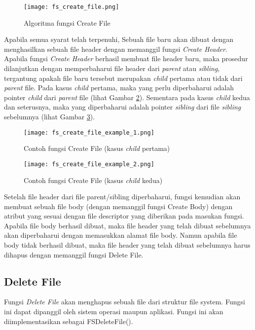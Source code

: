 \documentclass[a4paper, 12pt]{report}
\begin{document}
\begin{figure}
\centering
\texttt{[image: fs\_create\_file.png]}
\caption{Algoritma fungsi Create File}
\label{fig-create-file}
\end{figure}

Apabila semua syarat telah terpenuhi, Sebuah file baru akan dibuat dengan menghasilkan sebuah file header dengan memanggil fungsi {\em Create Header}. Apabila fungsi {\em Create Header} berhasil membuat file header baru, maka prosedur dilanjutkan dengan memperbaharui file header dari {\em parent} atau {\em sibling}, tergantung apakah file baru tersebut merupakan {\em child} pertama atau tidak dari {\em parent} file. Pada kasus {\em child} pertama, maka yang perlu diperbaharui adalah pointer {\em child} dari {\em parent} file (lihat Gambar \ref{fig-create-file-example-1}). Sementara pada kasus {\em child} kedua dan seterusnya, maka yang diperbaharui adalah pointer {\em sibling} dari file {\em sibling} sebelumnya (lihat Gambar \ref{fig-create-file-example-2}).

\begin{figure}
\centering
\texttt{[image: fs\_create\_file\_example\_1.png]}
\caption{Contoh fungsi Create File (kasus {\em child} pertama)}
\label{fig-create-file-example-1}
\end{figure}

\begin{figure}
\centering
\texttt{[image: fs\_create\_file\_example\_2.png]}
\caption{Contoh fungsi Create File (kasus {\em child} kedua)}
\label{fig-create-file-example-2}
\end{figure}

Setelah file header dari file parent/sibling diperbaharui, fungsi kemudian akan membuat sebuah file body (dengan memanggil fungsi Create Body) dengan atribut yang sesuai dengan file descriptor yang diberikan pada masukan fungsi. Apabila file body berhasil dibuat, maka file header yang telah dibuat sebelumnya akan diperbaharui dengan memasukkan alamat file body. Namun apabila file body tidak berhasil dibuat, maka file header yang telah dibuat sebelumnya harus dihapus dengan memanggil fungsi Delete File.


\subsection{Delete File}

Fungsi {\em Delete File} akan menghapus sebuah file dari struktur file system. Fungsi ini dapat dipanggil oleh sistem operasi maupun aplikasi. Fungsi ini akan diimplementasikan sebagai FSDeleteFile().
\end{document}
